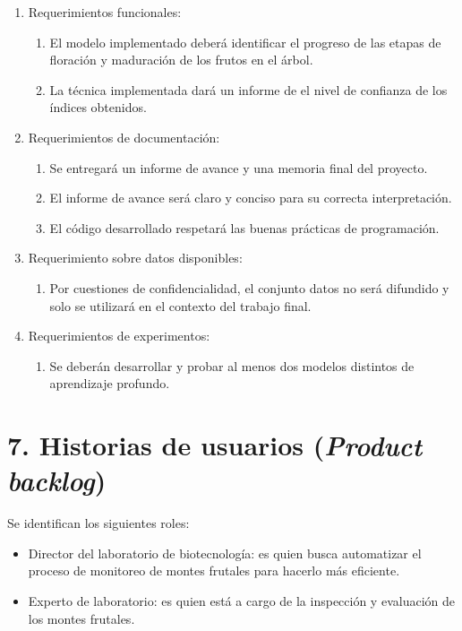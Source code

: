 \documentclass[
11pt, %
]{charter}
\begin{document}
\begin{enumerate}
	\item Requerimientos funcionales:
		\begin{enumerate}
			\item El modelo implementado deberá identificar el progreso de las etapas de floración y maduración de los frutos en el árbol.
			\item La técnica implementada dará un informe de el nivel de confianza de los índices obtenidos.
		\end{enumerate}
	\item Requerimientos de documentación:
		\begin{enumerate}
			\item Se entregará un informe de avance y una memoria final del proyecto.
			\item El informe de avance será claro y conciso para su correcta interpretación.
			\item El código desarrollado respetará las buenas prácticas de programación.
		\end{enumerate}
	\item Requerimiento sobre datos disponibles:
	\begin{enumerate}
        \item Por cuestiones de confidencialidad, el conjunto datos no será difundido y solo se utilizará
        en el contexto del trabajo final.
    \end{enumerate}
    \item Requerimientos de experimentos:
	\begin{enumerate}
        \item Se deberán desarrollar y probar al menos dos modelos distintos de aprendizaje profundo.
    \end{enumerate}
\end{enumerate}



\section{7. Historias de usuarios (\textit{Product backlog})}
\label{sec:backlog}
Se identifican los siguientes roles:
\begin{itemize}
    \item Director del laboratorio de biotecnología: es quien busca automatizar el proceso de monitoreo de
    montes frutales para hacerlo más eficiente.
    \item Experto de laboratorio: es quien está a cargo de la inspección y evaluación de los montes frutales.
\end{itemize}
\end{document}
